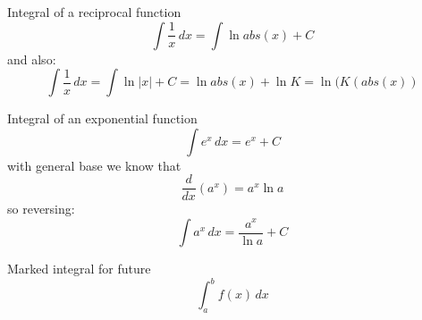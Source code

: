 \documentclass{article}
\begin{document}
Integral of a reciprocal function
\begin{equation}
  \int \frac{1}{x} \, dx = \int \ln abs(x) + C
\end{equation}
and also:
\begin{equation}
  \int \frac{1}{x} \, dx = \int \ln|x| + C = \ln abs(x) + \ln K = \ln (K (abs(x))
\end{equation}

Integral of an exponential function
\begin{equation}
  \int e^x \, dx = e^x + C
\end{equation}
with general base we know that
\begin{equation}
  \frac{d}{dx} (a^x) = a^x \ln a
\end{equation}
so reversing:
\begin{equation}
  \int a^x \, dx = \frac{a^x}{\ln a} + C
\end{equation}

Marked integral for future
\begin{equation}
  \int_{a}^{b} f(x) \, dx
\end{equation}
\end{document}
